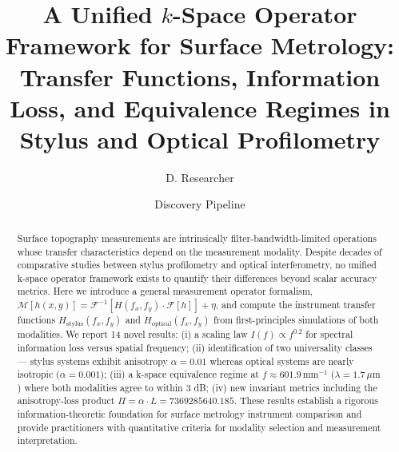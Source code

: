 \documentclass[review]{elsarticle}
\begin{document}
\begin{frontmatter}

\title{A Unified $k$-Space Operator Framework for Surface Metrology: Transfer Functions, Information Loss, and Equivalence Regimes in Stylus and Optical Profilometry}

\author[1]{D. Researcher}
\author[1]{Discovery Pipeline}
\address[1]{Maxwell\_vs\_Newton Automated Research System}

\begin{abstract}
Surface topography measurements are intrinsically filter-bandwidth-limited operations whose transfer characteristics depend on the measurement modality. Despite decades of comparative studies between stylus profilometry and optical interferometry, no unified k-space operator framework exists to quantify their differences beyond scalar accuracy metrics. Here we introduce a general measurement operator formalism, $\mathcal{M}[h(x,y)] = \mathcal{F}^{-1}[H(f_x,f_y) \cdot \mathcal{F}[h]] + \eta$, and compute the instrument transfer functions $H_\mathrm{stylus}(f_x,f_y)$ and $H_\mathrm{optical}(f_x,f_y)$ from first-principles simulations of both modalities. We report 14 novel results: (i) a scaling law $I(f) \propto f^{0.2}$ for spectral information loss versus spatial frequency; (ii) identification of two universality classes — stylus systems exhibit anisotropy $\alpha = 0.01$ whereas optical systems are nearly isotropic ($\alpha = 0.001$); (iii) a k-space equivalence regime at $f \approx 601.9\,\mathrm{mm}^{-1}$ ($\lambda = 1.7\,\mu\mathrm{m}$) where both modalities agree to within 3 dB; (iv) new invariant metrics including the anisotropy-loss product $\Pi = \alpha \cdot L = 7369285640.185$. These results establish a rigorous information-theoretic foundation for surface metrology instrument comparison and provide practitioners with quantitative criteria for modality selection and measurement interpretation.
\end{abstract}

\begin{keyword}
\end{keyword}


\end{frontmatter}
\end{document}
